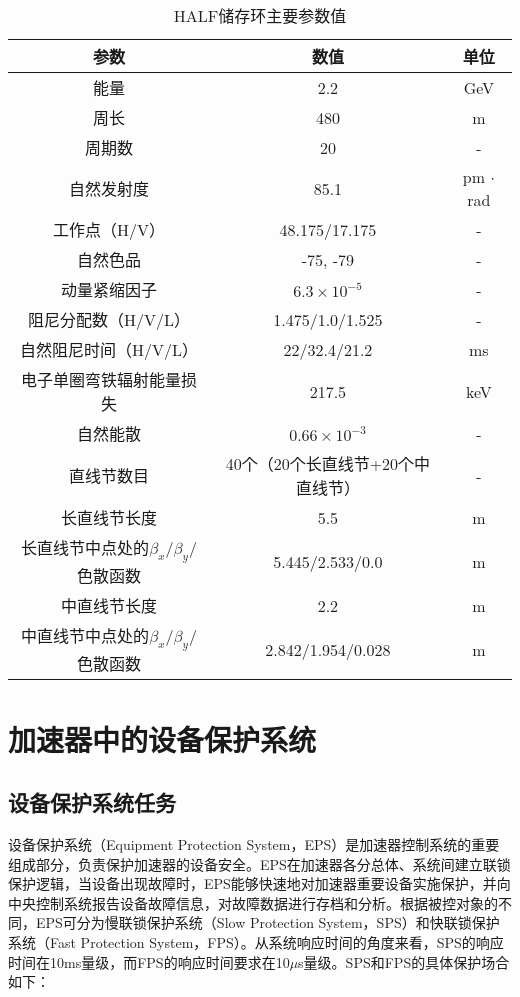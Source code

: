 \begin{table}[!htb]
	\centering\small
	\caption{HALF储存环主要参数值}
	\label{table:4.1}
	  \begin{tabular}{ccc}
		  \toprule
		  参数        & 数值 & 单位\\
		  \midrule
		  能量  &  2.2  & GeV \\
		  周长  & 480  &  m \\
		  周期数  & 20 & - \\
		  自然发射度  & 85.1  &  pm $\cdot$ rad \\
		  工作点（H/V）  & 48.175/17.175  & - \\
		  自然色品  & -75, -79  &  - \\
		  动量紧缩因子   & $6.3\times 10^{-5}$  &  - \\
		  阻尼分配数（H/V/L）  &  1.475/1.0/1.525  & -  \\
		  自然阻尼时间（H/V/L）  & 22/32.4/21.2  & ms \\
		  电子单圈弯铁辐射能量损失 & 217.5  &  keV \\
		  自然能散  & $0.66\times 10^{-3}$   & - \\
		  直线节数目  & 40个（20个长直线节+20个中直线节）& - \\
		  长直线节长度  & 5.5& m \\
		  长直线节中点处的$\beta_{x}$/$\beta_{y}$/色散函数 & 5.445/2.533/0.0 & m \\
		  中直线节长度  & 2.2 & m \\
		  中直线节中点处的$\beta_{x}$/$\beta_{y}$/色散函数  & 2.842/1.954/0.028 & m \\
		  \bottomrule
	  \end{tabular}
\end{table}

\section{加速器中的设备保护系统}

\subsection{设备保护系统任务}
设备保护系统（Equipment Protection System，EPS）是加速器控制系统的重要组成部分，负责保护加速器的设备安全。EPS在加速器各分总体、系统间建立联锁保护逻辑，当设备出现故障时，EPS能够快速地对加速器重要设备实施保护，并向中央控制系统报告设备故障信息，对故障数据进行存档和分析。根据被控对象的不同，EPS可分为慢联锁保护系统（Slow Protection System，SPS）和快联锁保护系统（Fast Protection System，FPS）。从系统响应时间的角度来看，SPS的响应时间在10ms量级，而FPS的响应时间要求在10$\mu$s量级。SPS和FPS的具体保护场合如下：

